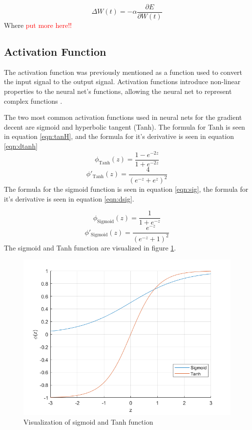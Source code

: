 \documentclass[12pt]{article}
\begin{document}
	\begin{equation}
	\Delta W(t) = - \alpha \frac{\partial E}{\partial W(t)}
	\label{eqn:gdes}
	\end{equation}
	Where 
	\textcolor{red}{put more here!!}
	
	\subsection{Activation Function}
	The activation function was previously mentioned as a function used to convert the input signal to the output signal. Activation functions introduce non-linear properties to the neural net's functions, allowing the neural net to represent complex functions \cite{nnBlog}. \par 
	The two most common activation functions used in neural nets for the gradient decent are sigmoid and hyperbolic tangent (Tanh). 
	The formula for Tanh is seen in equation \ref{eqn:tanH}, and the formula for it's derivative  is seen in equation \ref{eqn:dtanh} 
	\begin{equation}
	\phi_{\text{Tanh}}(z)=\frac{1-e^{-2z}}{1+e^{-2z}}
	\label{eqn:tanH}
	\end{equation}
	\begin{equation}
	\phi'_{\text{Tanh}}(z)=\frac{4}{\left(e^{-z}+e^{z}\right)^2}
	\label{eqn:dtanh}
	\end{equation}
	The formula for the sigmoid function is seen in equation \ref{eqn:sig}, the formula for it's derivative is seen in equation \ref{eqn:dsig}.
	
	\begin{equation}
	\phi_{\text{Sigmoid}}(z)=\frac{1}{1+e^{-z}}
	\label{eqn:sig}
	\end{equation}
	\begin{equation}
	\phi'_{\text{Sigmoid}}(z)=\frac{e^{-z}}{\left(e^{-z}+1\right)^2}
	\label{eqn:dsig}
	\end{equation}
	The sigmoid and Tanh function are visualized in figure \ref{fig:sigvstanh}.
	
	\begin{figure}
		\centering
		\includegraphics[width=0.4\linewidth]{sigVsTanh}
		\caption{Visualization of sigmoid and Tanh function}
		\label{fig:sigvstanh}
	\end{figure}
\end{document}
